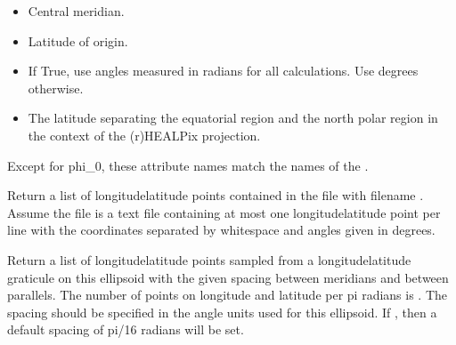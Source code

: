 \documentclass[a4paper,12ptopenany,oneside,english]{sphinxmanual}
\begin{document}
\begin{fulllineitems}
\begin{itemize}
\item {} 
\sphinxAtStartPar
{} \sphinxhyphen{} Central meridian.

\item {} 
\sphinxAtStartPar
{} \sphinxhyphen{} Latitude of origin.

\item {} 
\sphinxAtStartPar
{} \sphinxhyphen{} If True, use angles measured in radians for all calculations.
Use degrees otherwise.

\item {} 
\sphinxAtStartPar
{} \sphinxhyphen{} The latitude separating the equatorial region and
the north polar region in the context of the (r)HEALPix projection.

\end{itemize}

\sphinxAtStartPar
Except for phi\_0, these attribute names match the names of the
.

\begin{fulllineitems}
\label{\detokenize{ellipsoids:rhealpixdggs.ellipsoids.Ellipsoid.get_points}}
\pysigstartsignatures
{}
\pysigstopsignatures
\sphinxAtStartPar
Return a list of longitude\sphinxhyphen{}latitude points contained in
the file with filename .
Assume the file is a text file containing at most one
longitude\sphinxhyphen{}latitude point per line with the coordinates separated by
whitespace and angles given in degrees.

\end{fulllineitems}


\begin{fulllineitems}
\label{\detokenize{ellipsoids:rhealpixdggs.ellipsoids.Ellipsoid.graticule}}
\pysigstartsignatures
{}
\pysigstopsignatures
\sphinxAtStartPar
Return a list of longitude\sphinxhyphen{}latitude points sampled from a
longitude\sphinxhyphen{}latitude graticule on this ellipsoid with the given
spacing between meridians and between parallels.
The number of points on longitude and latitude per pi radians is .
The spacing should be specified in the angle units used for this
ellipsoid.
If , then a default spacing of pi/16 radians will be set.


\end{fulllineitems}
\end{fulllineitems}
\end{document}
